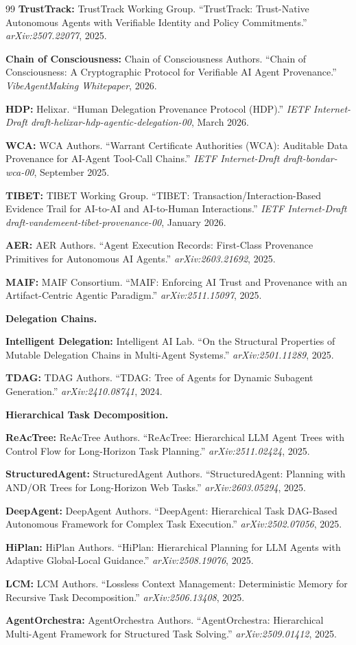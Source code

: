 \begin{thebibliography}{99}
\textbf{TrustTrack:} TrustTrack Working Group. ``TrustTrack: Trust-Native Autonomous Agents with Verifiable Identity and Policy Commitments.'' \emph{arXiv:2507.22077}, 2025.

\textbf{Chain of Consciousness:} Chain of Consciousness Authors. ``Chain of Consciousness: A Cryptographic Protocol for Verifiable AI Agent Provenance.'' \emph{VibeAgentMaking Whitepaper}, 2026.

\textbf{HDP:} Helixar. ``Human Delegation Provenance Protocol (HDP).'' \emph{IETF Internet-Draft draft-helixar-hdp-agentic-delegation-00}, March 2026.

\textbf{WCA:} WCA Authors. ``Warrant Certificate Authorities (WCA): Auditable Data Provenance for AI-Agent Tool-Call Chains.'' \emph{IETF Internet-Draft draft-bondar-wca-00}, September 2025.

\textbf{TIBET:} TIBET Working Group. ``TIBET: Transaction/Interaction-Based Evidence Trail for AI-to-AI and AI-to-Human Interactions.'' \emph{IETF Internet-Draft draft-vandemeent-tibet-provenance-00}, January 2026.

\textbf{AER:} AER Authors. ``Agent Execution Records: First-Class Provenance Primitives for Autonomous AI Agents.'' \emph{arXiv:2603.21692}, 2025.

\textbf{MAIF:} MAIF Consortium. ``MAIF: Enforcing AI Trust and Provenance with an Artifact-Centric Agentic Paradigm.'' \emph{arXiv:2511.15097}, 2025.

\smallskip\noindent\textbf{Delegation Chains.}

\textbf{Intelligent Delegation:} Intelligent AI Lab. ``On the Structural Properties of Mutable Delegation Chains in Multi-Agent Systems.'' \emph{arXiv:2501.11289}, 2025.

\textbf{TDAG:} TDAG Authors. ``TDAG: Tree of Agents for Dynamic Subagent Generation.'' \emph{arXiv:2410.08741}, 2024.

\smallskip\noindent\textbf{Hierarchical Task Decomposition.}

\textbf{ReAcTree:} ReAcTree Authors. ``ReAcTree: Hierarchical LLM Agent Trees with Control Flow for Long-Horizon Task Planning.'' \emph{arXiv:2511.02424}, 2025.

\textbf{StructuredAgent:} StructuredAgent Authors. ``StructuredAgent: Planning with AND/OR Trees for Long-Horizon Web Tasks.'' \emph{arXiv:2603.05294}, 2025.

\textbf{DeepAgent:} DeepAgent Authors. ``DeepAgent: Hierarchical Task DAG-Based Autonomous Framework for Complex Task Execution.'' \emph{arXiv:2502.07056}, 2025.

\textbf{HiPlan:} HiPlan Authors. ``HiPlan: Hierarchical Planning for LLM Agents with Adaptive Global-Local Guidance.'' \emph{arXiv:2508.19076}, 2025.

\textbf{LCM:} LCM Authors. ``Lossless Context Management: Deterministic Memory for Recursive Task Decomposition.'' \emph{arXiv:2506.13408}, 2025.

\textbf{AgentOrchestra:} AgentOrchestra Authors. ``AgentOrchestra: Hierarchical Multi-Agent Framework for Structured Task Solving.'' \emph{arXiv:2509.01412}, 2025.

\end{thebibliography}
